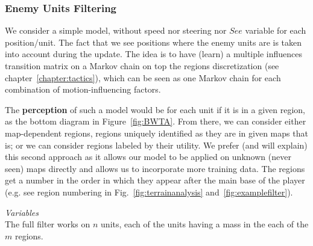 \subsubsection{Enemy Units Filtering}
\label{sec:enemyunitsfilter}
We consider a simple model, without speed nor steering nor $See$ variable for each position/unit. The fact that we see positions where the enemy units are is taken into account during the update.
The idea is to have (learn) a multiple influences transition matrix on a Markov chain on top the regions discretization (see chapter~\ref{chapter:tactics}), which can be seen as one Markov chain for each combination of motion-influencing factors.

The \textbf{perception} of such a model would be for each unit if it is in a given region, as the bottom diagram in Figure~\ref{fig:BWTA}. From there, we can consider either map-dependent regions, regions uniquely identified as they are in given maps that is; or we can consider regions labeled by their utility. We prefer (and will explain) this second approach as it allows our model to be applied on unknown (never seen) maps directly and allows us to incorporate more training data. The regions get a number in the order in which they appear after the main base of the player (e.g. see region numbering in Fig.~\ref{fig:terrainanalysis} and~\ref{fig:examplefilter}). %

\vspace{0.3cm}
\textit{Variables}\\
The full filter works on $n$ units, each of the units having a mass in the each of the $m$ regions.

